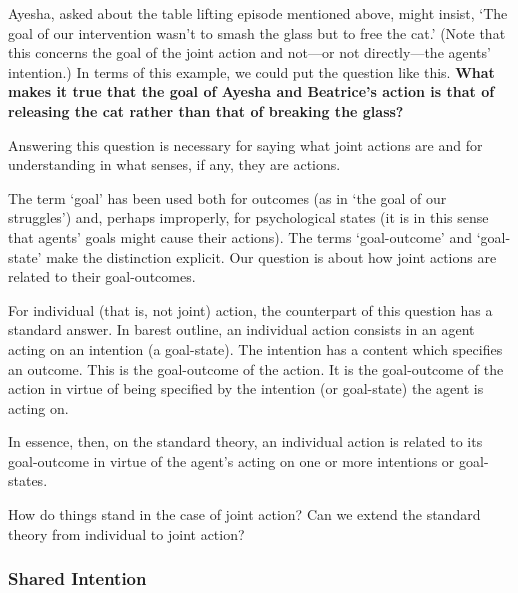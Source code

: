 \documentclass[14pt,a4paper]{extarticle}
\begin{document}
Ayesha, asked about the table lifting episode mentioned above, might insist, `The goal of our intervention wasn't to smash the glass but to free the cat.'  (Note that this concerns the goal of the joint action and not---or not directly---the agents' intention.)  In terms of this example, we could put the question like this.  \textbf{What makes it true that the goal of Ayesha and Beatrice's action is that of releasing the cat rather than that of breaking the glass?}

Answering this question is necessary for saying what joint actions are and for understanding in what senses, if any, they are actions.

The term `goal' has been used both for outcomes (as in `the goal of our struggles') and, perhaps improperly, for psychological states (it is in this sense that agents' goals might cause their actions).  The terms `goal-outcome' and `goal-state' make the distinction explicit.  Our question is about how joint actions are related to their goal-outcomes.

For individual (that is, not joint) action, the counterpart of this question has a standard answer.  In barest outline, an individual action consists in an agent acting on an intention (a goal-state).  The intention has a content which specifies an outcome.
This is the goal-outcome of the action.
It is the goal-outcome of the action in virtue of being specified by the intention (or goal-state) the agent is acting on. 

In essence, then, on the standard theory, an individual action is related to its goal-outcome in virtue of the agent's acting on one or more intentions or goal-states.


How do things stand in the case of joint action?  Can we extend the standard theory from individual to joint action?  


\subsubsection{Shared Intention}
\end{document}
